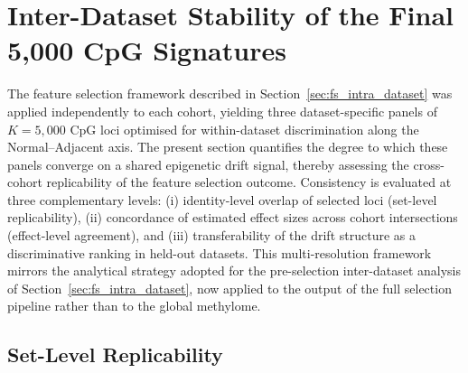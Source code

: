 \section{Inter-Dataset Stability of the Final 5{,}000 CpG Signatures}
\label{sec:inter_dataset_fs}

The feature selection framework described in Section~\ref{sec:fs_intra_dataset}
was applied independently to each cohort, yielding three dataset-specific
panels of $K = 5{,}000$ CpG loci optimised for within-dataset discrimination
along the Normal--Adjacent axis.
The present section quantifies the degree to which these panels converge
on a shared epigenetic drift signal, thereby assessing the cross-cohort
replicability of the feature selection outcome.
Consistency is evaluated at three complementary levels:
(i) identity-level overlap of selected loci (set-level replicability),
(ii) concordance of estimated effect sizes across cohort intersections
(effect-level agreement), and
(iii) transferability of the drift structure as a discriminative ranking
in held-out datasets.
This multi-resolution framework mirrors the analytical strategy adopted
for the pre-selection inter-dataset analysis of Section~\ref{sec:fs_intra_dataset},
now applied to the output of the full selection pipeline rather than to
the global methylome.


\subsection{Set-Level Replicability}
\label{sec:inter_fs_overlap}


